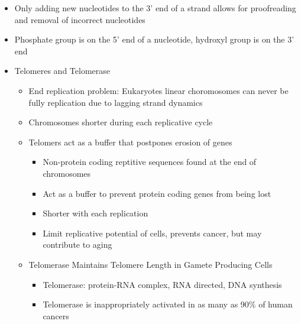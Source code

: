 \documentclass[12pt]{article}
\begin{document}
\begin{itemize}
        \item Only adding new nucleotides to the 3' end of a strand allows for proofreading and removal of incorrect nucleotides
        \item Phosphate group is on the 5' end of a nucleotide, hydroxyl group is on the 3' end
        \item Telomeres and Telomerase
        \begin{itemize}
            \item End replication problem: Eukaryotes linear choromosomes can never be fully replication due to lagging strand dynamics
            \item Chromosomes shorter during each replicative cycle
            \item Telomers act as a buffer that postpones erosion of genes
            \begin{itemize}
                \item Non-protein coding reptitive sequences found at the end of chromosomes
                \item Act as a buffer to prevent protein coding genes from being lost
                \item Shorter with each replication
                \item Limit replicative potential of cells, prevents cancer, but may contribute to aging
            \end{itemize}
            \item Telomerase Maintains Telomere Length in Gamete Producing Cells
            \begin{itemize}
                \item Telomerase: protein-RNA complex, RNA directed, DNA synthesis
                \item Telomerase is inappropriately activated in as many as 90\% of human cancers
            \end{itemize}
        \end{itemize}
    \end{itemize}
\end{document}
